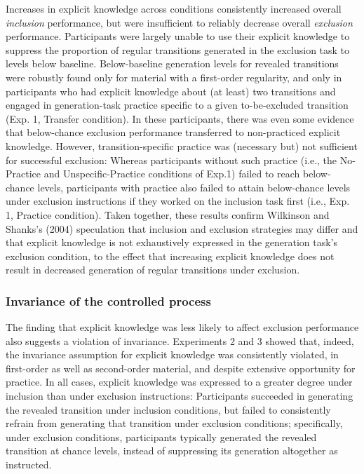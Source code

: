 \documentclass[floatsintext,doc]{apa6}
\theoremstyle{definition}
\theoremstyle{definition}
\theoremstyle{definition}
\theoremstyle{remark}
\begin{document}
Increases in explicit knowledge across conditions consistently increased
overall \emph{inclusion} performance, but were insufficient to reliably
decrease overall \emph{exclusion} performance. Participants were largely
unable to use their explicit knowledge to suppress the proportion of
regular transitions generated in the exclusion task to levels below
baseline. Below-baseline generation levels for revealed transitions were
robustly found only for material with a first-order regularity, and only
in participants who had explicit knowledge about (at least) two
transitions and engaged in generation-task practice specific to a given
to-be-excluded transition (Exp. 1, Transfer condition). In these
participants, there was even some evidence that below-chance exclusion
performance transferred to non-practiced explicit knowledge. However,
transition-specific practice was (necessary but) not sufficient for
successful exclusion: Whereas participants without such practice (i.e.,
the No-Practice and Unspecific-Practice conditions of Exp.1) failed to
reach below-chance levels, participants with practice also failed to
attain below-chance levels under exclusion instructions if they worked
on the inclusion task first (i.e., Exp. 1, Practice condition). Taken
together, these results confirm Wilkinson and Shanks's (2004)
speculation that inclusion and exclusion strategies may differ and that
explicit knowledge is not exhaustively expressed in the generation
task's exclusion condition, to the effect that increasing explicit
knowledge does not result in decreased generation of regular transitions
under exclusion.

\subsubsection{Invariance of the controlled
process}\label{invariance-of-the-controlled-process}

The finding that explicit knowledge was less likely to affect exclusion
performance also suggests a violation of invariance. Experiments 2 and 3
showed that, indeed, the invariance assumption for explicit knowledge
was consistently violated, in first-order as well as second-order
material, and despite extensive opportunity for practice. In all cases,
explicit knowledge was expressed to a greater degree under inclusion
than under exclusion instructions: Participants succeeded in generating
the revealed transition under inclusion conditions, but failed to
consistently refrain from generating that transition under exclusion
conditions; specifically, under exclusion conditions, participants
typically generated the revealed transition at chance levels, instead of
suppressing its generation altogether as instructed.
\end{document}
